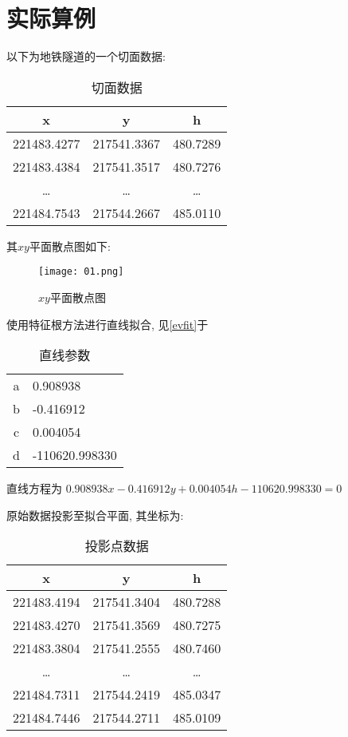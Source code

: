 \section{实际算例}

以下为地铁隧道的一个切面数据:
\begin{table}[!htbp]
    \centering
    \begin{tabular}{ccc} \hline
        x & y & h \\ \hline
        221483.4277 & 217541.3367 & 480.7289 \\
        221483.4384 & 217541.3517 & 480.7276 \\
        \ldots & \ldots & \ldots \\
        221484.7543 & 217544.2667 & 485.0110 \\ \hline
    \end{tabular}
    \caption{切面数据}
\end{table}

其$xy$平面散点图如下:
\begin{figure}[!htbp]
    \centering
    \texttt{[image: 01.png]}
    \caption{$xy$平面散点图}
\end{figure}

使用特征根方法进行直线拟合, 见\eqref{evfit}于\pageref{evfit}
\begin{table}[!htbp]
    \centering
    \begin{tabular}{cl} \hline 
        a & 0.908938 \\ 
        b & -0.416912 \\
        c & 0.004054 \\
        d & -110620.998330 \\ \hline
    \end{tabular}
    \caption{直线参数}
\end{table}

直线方程为 $0.908938x-0.416912y+0.004054h-110620.998330=0$

原始数据投影至拟合平面, 其坐标为:
\begin{table}[!htbp]
    \centering
    \begin{tabular}{ccc} \hline
        x & y & h \\ \hline
        221483.4194 & 217541.3404 & 480.7288 \\
        221483.4270 & 217541.3569 & 480.7275 \\
        221483.3804 & 217541.2555 & 480.7460 \\
        \ldots & \ldots & \ldots \\
        221484.7311 & 217544.2419 & 485.0347 \\
        221484.7446 & 217544.2711 & 485.0109 \\ \hline
    \end{tabular}
    \caption{投影点数据}
\end{table}


